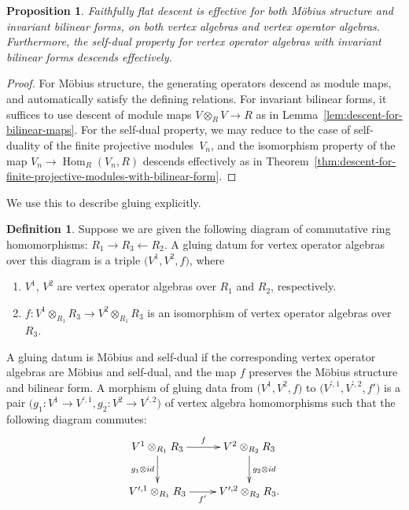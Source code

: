 \documentclass[11pt]{article}
\DeclareMathOperator{\Hom}{Hom}
\newtheorem{prop}[thm]{Proposition}
\theoremstyle{definition}
\newtheorem{defn}[thm]{Definition}
\begin{document}
\begin{prop} \label{prop:faithfully-flat-descent-for-Mobius-forms-and-self-duality}Faithfully flat descent is effective for both M\"obius structure and invariant bilinear forms, on both vertex algebras and vertex operator algebras. Furthermore, the self-dual property for vertex operator algebras with invariant bilinear forms descends effectively.
\end{prop}
\begin{proof}For M\"obius structure, the generating operators descend as module maps, and automatically satisfy the defining relations. For invariant bilinear forms, it suffices to use descent of module maps $V \otimes_{R} V \to R$ as in Lemma~\ref{lem:descent-for-bilinear-maps}. For the self-dual property, we may reduce to the case of self-duality of the finite projective modules~$V_n$, and the isomorphism property of the map $V_n \to \Hom_R(V_n,R)$ descends effectively as in Theorem~\ref{thm:descent-for-finite-projective-modules-with-bilinear-form}.
\end{proof}

We use this to describe gluing explicitly.

\begin{defn}Suppose we are given the following diagram of commutative ring homomorphisms: $R_1 \to R_3 \leftarrow R_2$. A gluing datum for vertex operator algebras over this diagram is a triple $\big(V^1, V^2, f\big)$, where
\begin{enumerate}\itemsep=0pt
\item $V^1$, $V^2$ are vertex operator algebras over $R_1$ and $R_2$, respectively.
\item $f\colon V^1 \otimes_{R_1} R_3 \to V^2 \otimes_{R_1} R_3$ is an isomorphism of vertex operator algebras over $R_3$.
\end{enumerate}
A gluing datum is M\"obius and self-dual if the corresponding vertex operator algebras are M\"obius and self-dual, and the map $f$ preserves the M\"obius structure and bilinear form. A morphism of gluing data from $\big(V^1, V^2, f\big)$ to $\big(V^{\prime,1}, V^{\prime,2}, f'\big)$ is a pair $\big(g_1\colon V^1 \to V^{\prime,1}, g_2\colon V^2 \to V^{\prime,2}\big)$ of vertex algebra homomorphisms such that the following diagram commutes:
\begin{gather*} \xymatrix{ V^1 \otimes_{R_1} R_3 \ar[r]^-{f} \ar[d]_{g_1 \otimes {\rm id}} & V^2 \otimes_{R_2} R_3 \ar[d]^{g_2 \otimes {\rm id}} \\ V^{\prime,1} \otimes_{R_1} R_3 \ar[r]_-{f'} & V^{\prime,2} \otimes_{R_2} R_3. } \end{gather*}
\end{defn}
\end{document}
